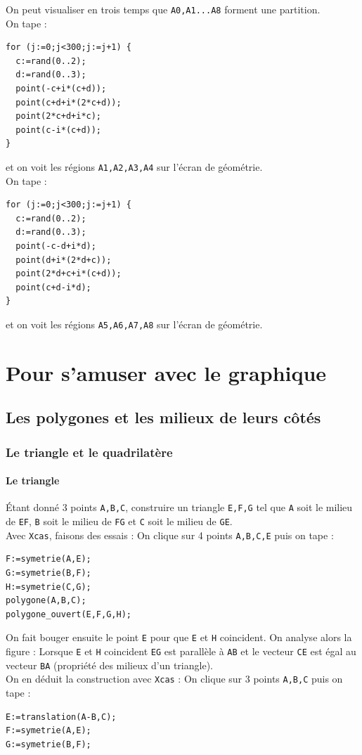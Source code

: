 \documentclass[a4paper,11pt]{book}
\begin{document}
On peut visualiser en trois temps que {\tt A0,A1...A8} forment une partition.\\
 On tape :
\begin{verbatim}
for (j:=0;j<300;j:=j+1) {
  c:=rand(0..2);
  d:=rand(0..3);
  point(-c+i*(c+d));
  point(c+d+i*(2*c+d));
  point(2*c+d+i*c);
  point(c-i*(c+d));
}
\end{verbatim} 
et on voit les r\'egions {\tt A1,A2,A3,A4} sur l'\'ecran de g\'eom\'etrie.\\
 On tape :
\begin{verbatim} 
for (j:=0;j<300;j:=j+1) {
  c:=rand(0..2);
  d:=rand(0..3);
  point(-c-d+i*d);
  point(d+i*(2*d+c));
  point(2*d+c+i*(c+d));
  point(c+d-i*d);
}
\end{verbatim} 
et on voit les r\'egions {\tt A5,A6,A7,A8} sur l'\'ecran de g\'eom\'etrie.\\


\chapter{Pour s'amuser avec le graphique}
\section{Les polygones et les milieux de leurs c\^ot\'es}
\subsection{Le triangle et le quadrilat\`ere}
\subsubsection{Le triangle}
\'Etant donn\'e 3 points {\tt A,B,C}, construire un triangle 
 {\tt E,F,G} tel que {\tt A} soit le milieu de {\tt EF},
{\tt B} soit le milieu de {\tt FG} et {\tt C} soit le milieu de 
{\tt GE}.\\
Avec {\tt Xcas}, faisons des essais :
On clique sur 4 points {\tt A,B,C,E} puis on tape :
\begin{verbatim}
F:=symetrie(A,E);
G:=symetrie(B,F);
H:=symetrie(C,G);
polygone(A,B,C);
polygone_ouvert(E,F,G,H);
\end{verbatim} 
On fait bouger ensuite le point {\tt E} pour que {\tt E} et {\tt H} coincident.
On analyse alors la figure :
Lorsque {\tt E} et {\tt H} coincident {\tt EG} est parall\`ele \`a {\tt AB} et
le vecteur {\tt CE} est \'egal au vecteur {\tt BA} (propri\'et\'e des milieux 
d'un triangle).\\
On en d\'eduit la construction avec {\tt Xcas} :
On clique sur 3 points {\tt A,B,C} puis on tape :
\begin{verbatim}
E:=translation(A-B,C);
F:=symetrie(A,E);
G:=symetrie(B,F);
\end{verbatim} 
\end{document}
